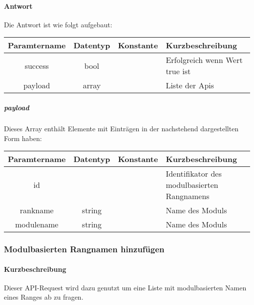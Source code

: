 \paragraph{Antwort}Die Antwort ist wie folgt aufgebaut:
\begin{table}[H]
	\begin{tabular}{|c|c|c|p{6.5cm}|}
		\hline
		\textbf{Paramtername} & \textbf{Datentyp} & \textbf{Konstante} & \textbf{Kurzbeschreibung}            \\ \hline                
		success             & bool             &                 & Erfolgreich wenn Wert {\glqq true\grqq} ist \\ \hline
		payload             & array            &                 & Liste der Apis \\ \hline
	\end{tabular}
\end{table}
\subparagraph{payload}Dieses Array enthält Elemente mit Einträgen in der nachstehend dargestellten Form haben:
\begin{table}[H]
	\begin{tabular}{|c|c|c|p{6.5cm}|}
		\hline
		\textbf{Paramtername} & \textbf{Datentyp} & \textbf{Konstante} & \textbf{Kurzbeschreibung}    \\ \hline
		id                      &                   &                 & Identifikator des modulbasierten Rangnamens \\ \hline
		rankname                & string            &                 & Name des Moduls \\ \hline
		modulename              & string            &                 & Name des Moduls \\ \hline
	\end{tabular}
\end{table}
\subsubsection{Modulbasierten Rangnamen hinzufügen}
\paragraph{Kurzbeschreibung}Dieser API-Request wird dazu genutzt um eine Liste mit modulbasierten Namen eines Ranges ab zu fragen.
